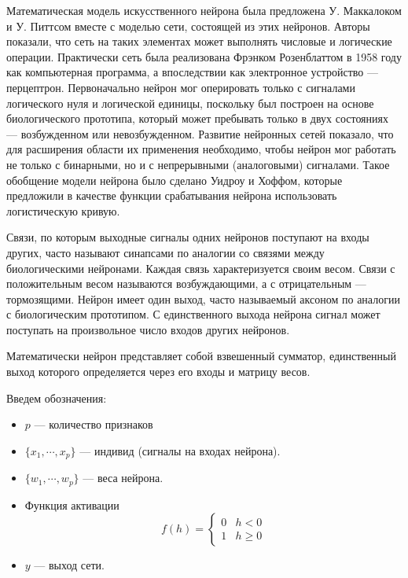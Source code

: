 \documentclass[11pt, oneside]{article}   	%
\begin{document}
	Математическая модель искусственного нейрона была предложена У. Маккалоком и У. Питтсом вместе с моделью сети, состоящей из этих нейронов. Авторы показали, что сеть на таких элементах может выполнять числовые и логические операции. Практически сеть была реализована Фрэнком Розенблаттом в 1958 году как компьютерная программа, а впоследствии как электронное устройство — перцептрон. Первоначально нейрон мог оперировать только с сигналами логического нуля и логической единицы, поскольку был построен на основе биологического прототипа, который может пребывать только в двух состояниях — возбужденном или невозбужденном. Развитие нейронных сетей показало, что для расширения области их применения необходимо, чтобы нейрон мог работать не только с бинарными, но и с непрерывными (аналоговыми) сигналами. Такое обобщение модели нейрона было сделано Уидроу и Хоффом, которые предложили в качестве функции срабатывания нейрона использовать логистическую кривую.
	
	Связи, по которым выходные сигналы одних нейронов поступают на входы других, часто называют синапсами по аналогии со связями между биологическими нейронами. Каждая связь характеризуется своим весом. Связи с положительным весом называются возбуждающими, а с отрицательным — тормозящими. Нейрон имеет один выход, часто называемый аксоном по аналогии с биологическим прототипом. С единственного выхода нейрона сигнал может поступать на произвольное число входов других нейронов.
	
	Математически нейрон представляет собой взвешенный сумматор, единственный выход которого определяется через его входы и матрицу весов.
	
	Введем обозначения:
	
	\begin{itemize}
		\item $p$ --- количество признаков
		\item $\{ x_1, \cdots, x_p \}$ --- индивид (сигналы на входах нейрона). 
		\item $\{ w_1, \cdots, w_p \}$ --- веса нейрона. 
		\item Функция активации \begin{equation*} 
			f(h) =  \begin{cases}
				0 & h < 0 \\
				1 & h \geqslant 0
			\end{cases}
		\end{equation*}
		\item $y$ --- выход сети.
	\end{itemize}
\end{document}
